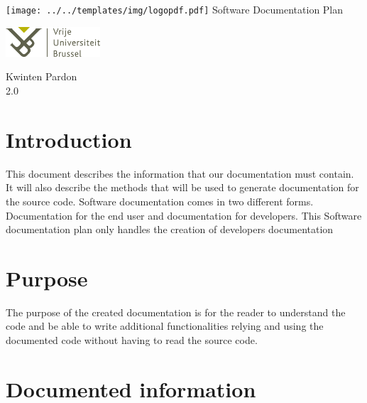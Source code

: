 \documentclass[12pt]{article}
\newcommand{\DocumentName}{Software Documentation Plan}
\newcommand{\Title}{\DocumentName \\ \hfill}
\newcommand{\Author}{Kwinten Pardon}
\newcommand{\Version}{2.0}
\begin{document}
\begin{titlepage}

\begin{center}
\texttt{[image: ../../templates/img/logopdf.pdf]}
\vfill
{\Huge \Title}
\hfill
\vfill
\vfill
\end{center}

\begin{minipage}[t]{1\textwidth}
\begin{flushleft}
\includegraphics[width=100pt]{../../templates/img/VUB_logo_compact.jpg}
\end{flushleft}
\end{minipage}

\begin{minipage}[t]{1\textwidth}
\begin{flushright}
\Author \\
\Version \\
\end{flushright}
\end{minipage}

\end{titlepage}

\section{Introduction}\label{introduction}

This document describes the information that our documentation must
contain. It will also describe the methods that will be used to generate
documentation for the source code. Software documentation comes in two
different forms. Documentation for the end user and documentation for
developers. This Software documentation plan only handles the creation
of developers documentation

\section{Purpose}\label{purpose}

The purpose of the created documentation is for the reader to understand
the code and be able to write additional functionalities relying and
using the documented code without having to read the source code.

\section{Documented information}\label{documented-information}
\end{document}
